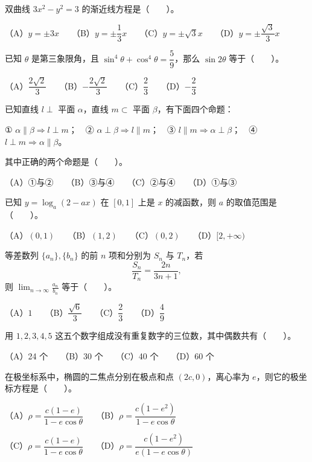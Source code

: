 \begin{question}
双曲线 $3x^2-y^2=3$ 的渐近线方程是\mbox{（　　）}。

（A）$y=\pm3x$　　（B）$y=\pm\dfrac13x$　　（C）$y=\pm\sqrt3x$　　（D）$y=\pm\dfrac{\sqrt3}{3}x$

\end{question}
\begin{question}
已知 $\theta$ 是第三象限角，且 $\sin^4\theta+\cos^4\theta=\dfrac59$，那么 $\sin2\theta$ 等于\mbox{（　　）}。

（A）$\dfrac{2\sqrt2}{3}$　　（B）$-\dfrac{2\sqrt2}{3}$　　（C）$\dfrac23$　　（D）$-\dfrac23$

\end{question}
\begin{question}
已知直线 $l\perp$ 平面 $\alpha$，直线 $m\subset$ 平面 $\beta$，有下面四个命题：

① $\alpha\parallel\beta\Rightarrow l\perp m$；　② $\alpha\perp\beta\Rightarrow l\parallel m$；　③ $l\parallel m\Rightarrow\alpha\perp\beta$；　④ $l\perp m\Rightarrow\alpha\parallel\beta$。

其中正确的两个命题是\mbox{（　　）}。

（A）①与②　　（B）③与④　　（C）②与④　　（D）①与③

\end{question}
\begin{question}
已知 $y=\log_a(2-ax)$ 在 $[0,1]$ 上是 $x$ 的减函数，则 $a$ 的取值范围是\mbox{（　　）}。

（A）$(0,1)$　　（B）$(1,2)$　　（C）$(0,2)$　　（D）$[2,+\infty)$

\end{question}
\begin{question}
等差数列 $\{a_n\},\{b_n\}$ 的前 $n$ 项和分别为 $S_n$ 与 $T_n$，若
\nopagebreak[4]
\[
\frac{S_n}{T_n}=\frac{2n}{3n+1},
\]
则 $\displaystyle\lim_{n\to\infty}\frac{a_n}{b_n}$ 等于\mbox{（　　）}。

（A）$1$　　（B）$\dfrac{\sqrt6}{3}$　　（C）$\dfrac23$　　（D）$\dfrac49$

\end{question}
\begin{question}
用 $1,2,3,4,5$ 这五个数字组成没有重复数字的三位数，其中偶数共有\mbox{（　　）}。

（A）24 个　　（B）30 个　　（C）40 个　　（D）60 个

\end{question}
\begin{question}
在极坐标系中，椭圆的二焦点分别在极点和点 $(2c,0)$，离心率为 $e$，则它的极坐标方程是\mbox{（　　）}。

（A）$\rho=\dfrac{c(1-e)}{1-e\cos\theta}$　　（B）$\rho=\dfrac{c(1-e^2)}{1-e\cos\theta}$

（C）$\rho=\dfrac{c(1-e)}{1-e\cos\theta}$　　（D）$\rho=\dfrac{c(1-e^2)}{e(1-e\cos\theta)}$

\Needspace{0.4\textheight}
\end{question}
